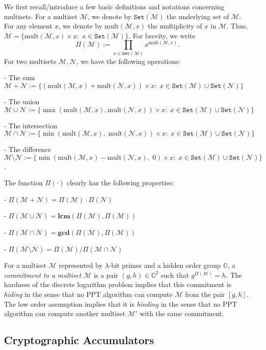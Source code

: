 \documentclass[11pt, lettersize, notitlepage, leqno, footskip=0.6cm]{article}
\newcommand{\pl}{\prod\limits}
\newcommand{\ttt}{\texttt}
\newcommand{\bG}{\mathbb{G}}
\newcommand{\sett}{\ttt{Set}}
\newcommand{\mult}{\mr{mult}}
\newcommand{\mul}{\mr{mult}}
\newcommand{\mc}{\mathcal}
\newcommand{\mbf}{\mathbf}
\newcommand{\mr}{\mathrm}
\newcommand{\sm}{\setminus}
\newcommand{\lam}{\lambda}
\newcommand{\mcM}{\mc{M}}
\newcommand{\vs}{\vspace{-0.15cm}}
\newcommand{\noin}{\noindent}
\newcommand{\LCM}{\mbf{lcm}}
\newcommand{\GCD}{\mbf{gcd}}
\numberwithin{equation}{section}
\begin{document}
We first recall/introduce a few basic definitions and notations concerning multisets. For a multiset $\mc{M}$, we denote by $\sett(\mc{M})$ the underlying set of $\mc{M}$. For any element $x$, we denote by $\mul(\mc{M},x)$ the multiplicity of $x$ in $\mc{M}$. Thus, $\mc{M} = \{ \mult(\mc{M},x)\times x: \; x\in \sett(\mc{M})\}$. For brevity, we write \vs $$\Pi(\mc{M}):= \pl_{x\in \sett(\mc{M})} x^{\mult(\mc{M},x)}.$$ For two multisets $\mc{M}, \mc{N}$, we have the following operations:\vspace{0.1cm}

\noin - The sum $\mc{M}+\mc{N} := \{(\mul(\mc{M},x)+\mul(\mc{N},x))\times x:\;x\in \sett(\mc{M})\cup\sett(\mc{N}) \}$

\noin - The union $\mc{M}\cup \mc{N} := \{\max(\mul(\mc{M},x),\mul(\mc{N},x))\times x:\;x\in \sett(\mc{M})\cup\sett(\mc{N})\}$

\noin - The intersection $\mc{M}\cap \mc{N} := \{\min(\mul(\mc{M},x),\;\mul(\mc{N},x))\times x:\;x\in \sett(\mc{M})\cup\sett(\mc{N})\}$

\noin - The difference $\mc{M}\sm \mc{N} := \{\min(\mul(\mc{M},x)-\mul(\mc{N},x),\; 0)\times x:\;x\in \sett(\mc{M})\cup\sett(\mc{N})\}$.\vspace{0.1cm}

\noin The function $\Pi(\cdot)$ clearly has the following properties:

\noin- $\Pi(\mc{M}+\mc{N})= \Pi(\mc{M})\cdot\Pi(\mc{N})$

\noin - $\Pi(\mc{M}\cup \mc{N}) = \LCM(\Pi(\mc{M}), \Pi(\mc{M}))$

\noin - $\Pi(\mc{M}\cap \mc{N}) = \GCD(\Pi(\mc{M}), \Pi(\mc{M}))$

\noin - $\Pi(\mc{M}\sm \mc{N}) = {\Pi(\mc{M})}/{\Pi(\mc{M}\cap \mc{N})}$\vspace{0.1cm}

For a multiset $\mc{M}$ represented by $\lam$-bit primes and a hidden order group $\bG$, a \textit{commitment to a multiset} $\mc{M}$ is a pair $(g, h)\in\bG^2$ such that $g^{\Pi(\mc{M})} = h$. The hardness of the discrete logarithm problem implies that this commitment is \textit{hiding} in the sense that no PPT algorithm can compute $\mcM$ from the pair $[g,h]$. The low order assumption implies that it is \textit{binding} in the sense that no PPT algorithm can compute another multiset $\mcM'$ with the same commitment.

\subsection{\fontsize{11}{11}\selectfont Cryptographic Accumulators }
\end{document}
